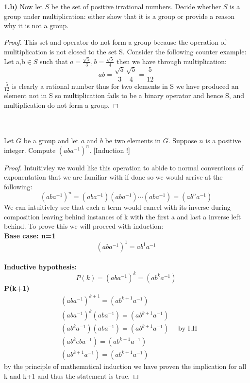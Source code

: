 \documentclass[11pt]{amsart}
\theoremstyle{definition}  %
\begin{document}
\\\\
{\bf 1.b)} Now let $S$ be the set of positive irrational numbers. Decide whether $S$ is a group under multiplication: either show that it is a group or provide
a reason why it is not a group. \\
\begin{proof}
  This set and  operator do not form a group because the operation of mulitiplication is not closed to the set S. Consider the following counter example:
  Let a,b$\in S$ such that $a=\frac{\sqrt{5}}{3}, b=\frac{\sqrt{5}}{4}$ then we have through multiplication:
  \[
    ab=\frac{\sqrt{5}}{3}\frac{\sqrt{5}}{4}=\frac{5}{12}
  \]
  $\frac{5}{12}$ is clearly a rational number thus for two elements in S we have produced an element not in S so multiplication fails to be a binary operator and hence S, and multiplication do not form a group. 
\end{proof}
\noindent\makebox[\linewidth]{\rule{\paperwidth}{0.4pt}}
\\\\
 Let $G$ be a group and let $a$ and $b$ be two elements in $G$. Suppose $n$ is a positive integer. Compute $(aba^{-1})^n$. [Induction !]\\
\begin{proof}
  Intuitivley we would like this operation to abide to normal conventions of exponentation that we are familiar with if done so we would arrive at the following:
  \[
    (aba^{-1})^n=(aba^{-1})(aba^{-1})\cdots (aba^{-1})=(ab^na^{-1})
  \]
  We can intuitivley see that each a term would cancel with its inverse during composition leaving behind instances of k with the first a and last a inverse left behind.
  To prove this we will proceed with induction:\\
  \textbf{Base case: n=1}\\
  $$(aba^{-1})^1=ab^1a^{-1}$$\\
  \textbf{Inductive hypothesis:}\\
  \[
    P(k)=(aba^{-1})^k=(ab^ka^{-1})
  \]
  \textbf{P(k+1)}\\
  \begin{align*}
    &(aba^{-1})^{k+1}=(ab^{k+1}a^{-1})\\
    &(aba^{-1})^{k}(aba^{-1})=(ab^{k+1}a^{-1})\\
    &(ab^ka^{-1})(aba^{-1})=(ab^{k+1}a^{-1}) \quad \text{ by I.H}\\
    &(ab^keba^{-1})=(ab^{k+1}a^{-1})\\
    &(ab^{k+1}a^{-1})=(ab^{k+1}a^{-1})
  \end{align*}
  by the principle of mathematical induction we have proven the implication for all k and k+1 and thus the statement is true.
\end{proof}
\end{document}
